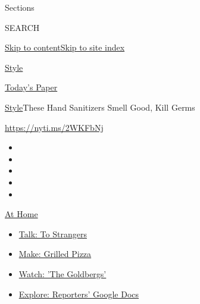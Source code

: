Sections

SEARCH

\protect\hyperlink{site-content}{Skip to
content}\protect\hyperlink{site-index}{Skip to site index}

\href{https://www.nytimes3xbfgragh.onion/section/style}{Style}

\href{https://myaccount.nytimes3xbfgragh.onion/auth/login?response_type=cookie\&client_id=vi}{}

\href{https://www.nytimes3xbfgragh.onion/section/todayspaper}{Today's
Paper}

\href{/section/style}{Style}\textbar{}These Hand Sanitizers Smell Good,
Kill Germs

\url{https://nyti.ms/2WKFbNj}

\begin{itemize}
\item
\item
\item
\item
\item
\end{itemize}

\href{https://www.nytimes3xbfgragh.onion/spotlight/at-home?action=click\&pgtype=Article\&state=default\&region=TOP_BANNER\&context=at_home_menu}{At
Home}

\begin{itemize}
\tightlist
\item
  \href{https://www.nytimes3xbfgragh.onion/2020/08/03/well/family/the-benefits-of-talking-to-strangers.html?action=click\&pgtype=Article\&state=default\&region=TOP_BANNER\&context=at_home_menu}{Talk:
  To Strangers}
\item
  \href{https://www.nytimes3xbfgragh.onion/2020/08/01/at-home/coronavirus-make-pizza-on-a-grill.html?action=click\&pgtype=Article\&state=default\&region=TOP_BANNER\&context=at_home_menu}{Make:
  Grilled Pizza}
\item
  \href{https://www.nytimes3xbfgragh.onion/2020/07/31/arts/television/goldbergs-abc-stream.html?action=click\&pgtype=Article\&state=default\&region=TOP_BANNER\&context=at_home_menu}{Watch:
  'The Goldbergs'}
\item
  \href{https://www.nytimes3xbfgragh.onion/interactive/2020/at-home/even-more-reporters-editors-diaries-lists-recommendations.html?action=click\&pgtype=Article\&state=default\&region=TOP_BANNER\&context=at_home_menu}{Explore:
  Reporters' Google Docs}
\end{itemize}

